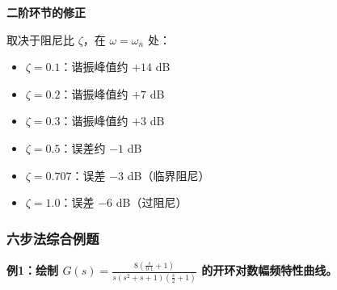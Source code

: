\textbf{二阶环节的修正}

取决于阻尼比 $\zeta$，在 $\omega = \omega_n$ 处：
\begin{itemize}
    \item $\zeta = 0.1$：谐振峰值约 $+14$ dB
    \item $\zeta = 0.2$：谐振峰值约 $+7$ dB
    \item $\zeta = 0.3$：谐振峰值约 $+3$ dB
    \item $\zeta = 0.5$：误差约 $-1$ dB
    \item $\zeta = 0.707$：误差 $-3$ dB（临界阻尼）
    \item $\zeta = 1.0$：误差 $-6$ dB（过阻尼）
\end{itemize}

\subsubsection{六步法综合例题}

\textbf{例1：绘制 $G(s) = \frac{8(\frac{s}{0.1}+1)}{s(s^2+s+1)(\frac{s}{2}+1)}$ 的开环对数幅频特性曲线。}

